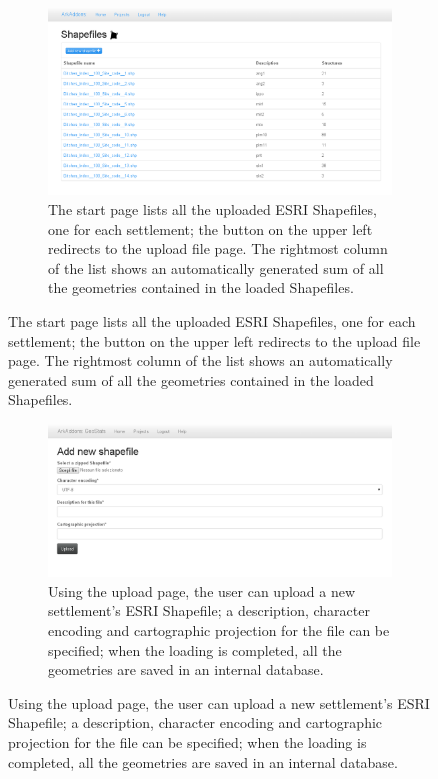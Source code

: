             \vfill

            \begin{figure}[H]
                \ContinuedFloat
                \begin{subfigure}[b]{1\textwidth}
                    \centering
                    \includegraphics[width=1\textwidth]{img/shp-list}
                    \caption{The start page lists all the uploaded ESRI Shapefiles, one for each settlement; the button on the upper left redirects to the upload file page. The rightmost column of the list shows an automatically generated sum of all the geometries contained in the loaded Shapefiles.}
                    \label{fig:shp-list}
                \end{subfigure}
            \end{figure}

            \vfill

            \begin{figure}[H]
                \ContinuedFloat
                \begin{subfigure}[b]{1\textwidth}
                    \centering
                    \includegraphics[width=1\textwidth]{img/shp-upload}
                    \caption{Using the upload page, the user can upload a new settlement's ESRI Shapefile; a description, character encoding and cartographic projection for the file can be specified; when the loading is completed, all the geometries are saved in an internal database.}
                    \label{fig:shp-upload}
                \end{subfigure}

            \end{figure}

